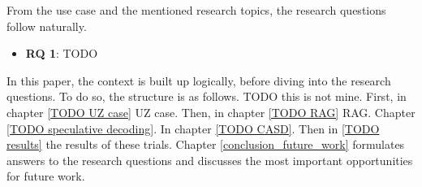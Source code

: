 From the use case and the mentioned research topics, the research questions follow naturally.

\begin{itemize}
    \item \textbf{RQ 1}: TODO
\end{itemize}

In this paper, the context is built up logically, before diving into the research questions. To do so, the structure is as follows. TODO this is not mine. First, in chapter \ref{TODO UZ case} UZ case. Then, in chapter \ref{TODO RAG} RAG. Chapter \ref{TODO speculative decoding}. In chapter \ref{TODO CASD}. Then in \ref{TODO results} the results of these trials. Chapter \ref{conclusion_future_work} formulates answers to the research questions and discusses the most important opportunities for future work.\\